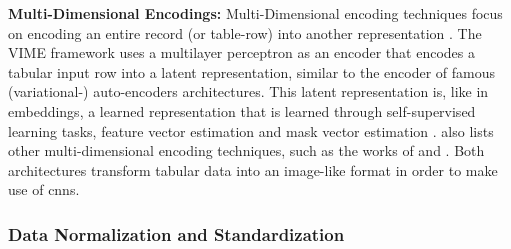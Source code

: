 
\textbf{Multi-Dimensional Encodings:}
Multi-Dimensional encoding techniques focus on encoding an entire record (or table-row) into another representation \cite{borisov2022DeepNeuralNetworks}.
The VIME framework \cite{yoon2020VIMEExtendingSuccess} uses a multilayer perceptron as an encoder that encodes a tabular input row into a latent representation, 
similar to the encoder of famous (variational-) auto-encoders \cite{kingma2013AutoEncodingVariationalBayes} architectures.
This latent representation is, like in embeddings, a learned representation that is learned through self-supervised learning tasks, feature vector estimation and mask vector estimation \cite{yoon2020VIMEExtendingSuccess}.
\cite{borisov2022DeepNeuralNetworks} also lists other multi-dimensional encoding techniques, such as the works of \cite{zhu2021ConvertingTabularData} and \cite{sun2019supertml}.
Both architectures transform tabular data into an image-like format in order to make use of \glspl{cnn}.


\subsubsection{Data Normalization and Standardization}
\label{sec:dataNormalization} 

